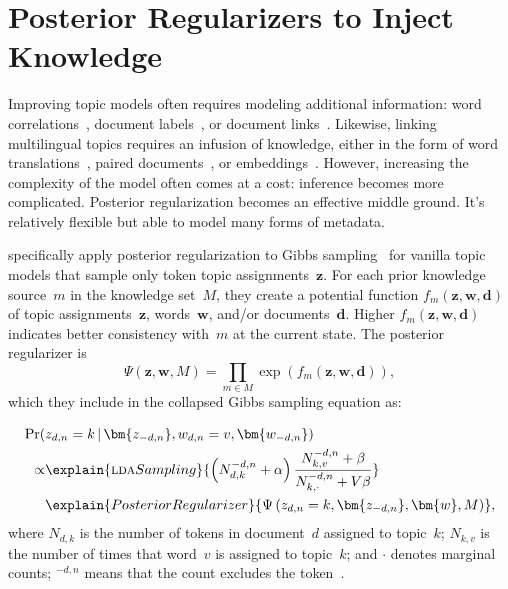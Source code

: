 \section{Posterior Regularizers to Inject Knowledge}
\label{sec:post_reg}

Improving topic models often requires modeling additional information:
word correlations~\cite{boyd-graber-2007-tm-wsd}, document
labels~\cite{mcauliffe-2008-slda}, or document
links~\cite{chang-2010-rtm}.
%
Likewise, linking multilingual topics requires an infusion of
knowledge, either in the form of word translations~\cite{Hu-2014-ptlda}, paired documents~\cite{mimno-2009-plda},
or embeddings~\cite{das-2015-glda,ammar-2016-uw-embed}.
However, increasing the complexity of the model often comes at a cost:
inference becomes more complicated.  Posterior regularization becomes
an effective middle ground.  It's relatively flexible but able to model many
forms of metadata.

 specifically apply posterior
regularization to Gibbs sampling~\cite{heinrich-09} for
vanilla topic models that sample only token topic
assignments~$\bm{z}$.
For each prior knowledge source~$m$ in the knowledge set~$M$, they
create a potential function $f_m (\bm{z}, \bm{w}, \bm{d})$ of topic assignments~$\bm{z}$,
words~$\bm{w}$, and/or documents~$\bm{d}$.
Higher $f_m (\bm{z}, \bm{w}, \bm{d})$ indicates better consistency
with~$m$ at the current state.  The posterior regularizer is
\begin{equation}\label{equ:post_reg}
\Psi \left( \bm{z}, \bm{w}, M \right) = \prod_{m \in M} \exp \left( f_m (\bm{z}, \bm{w}, \bm{d}) \right),
\end{equation}
which they include in the collapsed Gibbs sampling equation
as:\par\nobreak
\begin{align}
\Pr ( &z_{d,n}=k \,|\, \bm{z_{-d,n}}, w_{d,n}=v, \bm{w_{-d,n}} ) \notag\\
\propto & \explain{\textsc{lda} Sampling}{ \left( N_{d,k}^{-d,n}+\alpha \right) \frac{N_{k,v}^{-d,n}+\beta}{N_{k,\cdot}^{-d,n}+V\beta}} \notag\\
& \explain{Posterior Regularizer}{\Psi \left( z_{d,n}=k, \bm{z_{-d,n}}, \bm{w}, M \right)}, \label{equ:gibbs_post_reg}
\end{align}
where $N_{d,k}$ is the number of tokens in document~$d$ assigned to
topic~$k$; $N_{k,v}$ is the number of times that word~$v$ is assigned
to topic~$k$; and $\cdot$ denotes marginal counts; $^{-d,n}$ means
that the count excludes the token~\cite{heinrich-09,resnik-2010-gibbs}.

